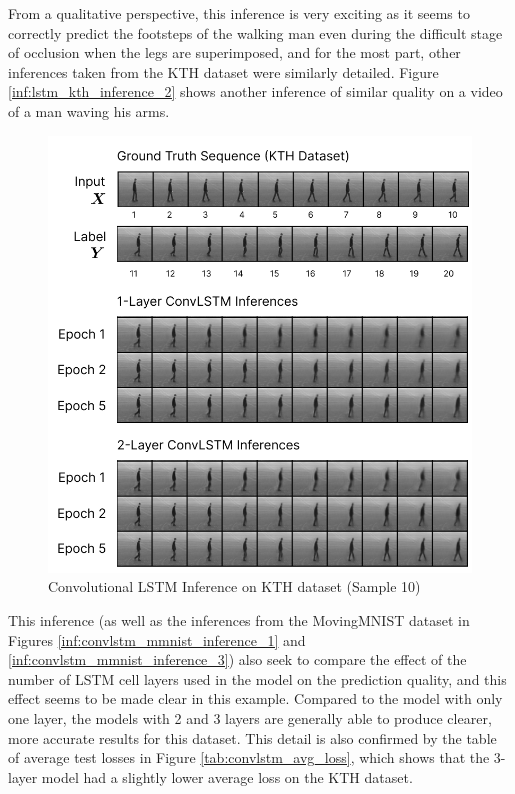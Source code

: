 \documentclass{scrartcl}
\begin{document}
From a qualitative perspective, this inference is very exciting as it seems to
correctly predict the footsteps of the walking man even during the difficult
stage of occlusion when the legs are superimposed, and for the most part, other
inferences taken from the KTH dataset were similarly detailed. Figure
\ref{inf:lstm_kth_inference_2} shows another inference of similar quality on a
video of a man waving his arms.

\begin{figure}[H]
	\begin{center}
		\includegraphics[width=1\textwidth]{inferences/kth/kth_inferences.png}
	\end{center}
	\caption{Convolutional LSTM Inference on KTH dataset (Sample 10)}
	\label{inf:lstm_kth_inference_1}
\end{figure}

This inference (as well as the inferences from the MovingMNIST dataset in
Figures \ref{inf:convlstm_mmnist_inference_1} and
\ref{inf:convlstm_mmnist_inference_3}) also seek to compare the effect of the
number of LSTM cell layers used in the model on the prediction quality, and
this effect seems to be made clear in this example. Compared to the model with
only one layer, the models with 2 and 3 layers are generally able to produce
clearer, more accurate results for this dataset. This detail is also confirmed
by the table of average test losses in Figure \ref{tab:convlstm_avg_loss},
which shows that the 3-layer model had a slightly lower average loss on the KTH
dataset.
\end{document}
